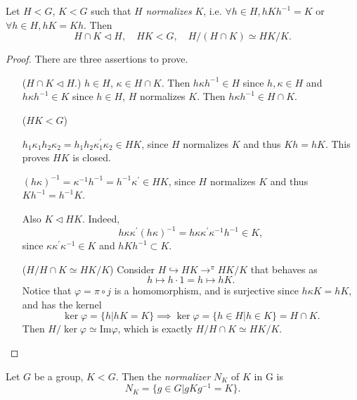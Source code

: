 \documentclass{article}
\begin{document}
\begin{theorem}
Let $H < G$, $K < G$ such that $H$ \emph{normalizes} $K$, i.e.
$\forall h \in H, h K h^{-1} = K$ or
$\forall h \in H, h K = K h$. Then
$$
H \cap K \triangleleft H, 
\quad HK < G,
\quad H / (H \cap K) \simeq HK / K.
$$
\end{theorem}
\begin{proof} There are three assertions to prove.
\begin{itemize}
  \item[($H \cap K \triangleleft H$.)]{
        $h \in H$, $\kappa \in H \cap K$. Then
        $h \kappa h^{-1} \in H$ since $h, \kappa \in H$
        and $h \kappa h^{-1} \in K$ since $h \in H$, $H$ normalizes
        $K$.
        Then $h \kappa h^{-1} \in H \cap K$.
       }
  \item[($HK < G$)]{
        $h_1 \kappa_1 h_2 \kappa_2 
       = h_1 h_2 \kappa_1^\prime \kappa_2
       \in HK$, since $H$ normalizes $K$ and thus $Kh = hK$. 
       This proves $HK$ is closed.

       $(h \kappa)^{-1} = \kappa^{-1} h^{-1} = h^{-1} \kappa^\prime \in HK$, since
       $H$ normalizes $K$ and thus $K h^{-1} = h^{-1} K$.

       Also $K \triangleleft HK$. Indeed, 
       $$
       h \kappa \kappa^\prime (h \kappa)^{-1} 
     = h \kappa \kappa^\prime \kappa^{-1} h^{-1} \in K,
       $$
       since $\kappa \kappa^\prime \kappa^{-1} \in K$ and
       $h K h^{-1} \subset K$.
       }
       \item[($H / H \cap K \simeq HK / K$)]{
             Consider $H \hookrightarrow HK \to^{\pi} HK / K$ that behaves as
             $$
             h \mapsto h \cdot 1 = h \mapsto h K.
             $$
             Notice that $\varphi = \pi \circ j$ is a homomorphism, and is
             surjective since $h \kappa K = h K$, and has the kernel
             $$
             \ker \varphi = \{ h | hK = K \} \implies
             \ker \varphi = \{ h \in H | h \in K \} = H \cap K.
             $$
             Then $H / \ker \varphi \simeq \mathrm{Im} \varphi$, which
             is exactly
             $H / H \cap K \simeq HK / K$.
            }
\end{itemize}
\end{proof}

\begin{defn}[Normalizer]
Let $G$ be a group, $K < G$. Then the \emph{normalizer}
$N_K$ of $K$ in G is
$$
N_K = \{ g \in G | g K g^{-1} = K \}.
$$
\end{defn}
\end{document}
